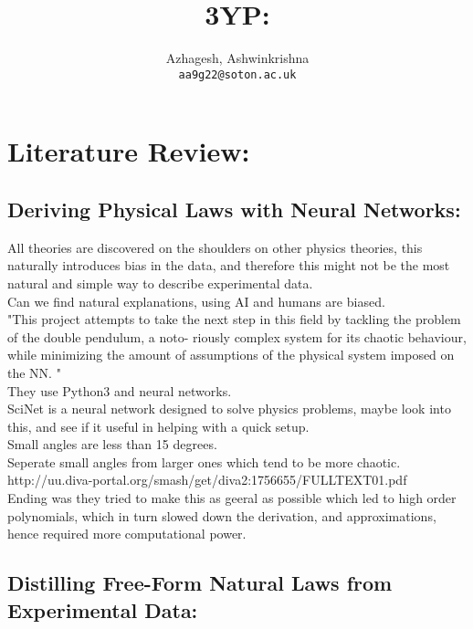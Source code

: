 \documentclass [12pt]{article}
\title{3YP:}
\author{
	Azhagesh, Ashwinkrishna\\
	\texttt{aa9g22@soton.ac.uk}
}
\begin{document}
\maketitle 

\section{Literature Review: }

\subsection{Deriving Physical Laws with Neural Networks: }

All theories are discovered on the shoulders on other physics theories, this naturally introduces bias in the data, and therefore 
this might not be the most natural and simple way to describe experimental data.\\ 

Can we find natural explanations, using AI and humans are biased.\\ 

"This project attempts to take the next step in this field by tackling the problem of the double pendulum, a noto-
riously complex system for its chaotic behaviour, while minimizing the amount of assumptions of the physical
system imposed on the NN. "\\

They use Python3 and neural networks.\\ 

SciNet is a neural network designed to solve physics problems, maybe look into this, and see if it useful in helping with a quick setup.\\ 

Small angles are less than 15 degrees.\\ 

Seperate small angles from larger ones which tend to be more chaotic.\\ 

http://uu.diva-portal.org/smash/get/diva2:1756655/FULLTEXT01.pdf\\ 

Ending was they tried to make this as geeral as possible which led to high order polynomials, which in turn slowed down the derivation, and approximations, hence required more computational power.\\ 

  
\subsection{Distilling Free-Form Natural Laws from Experimental Data: }
\end{document}
